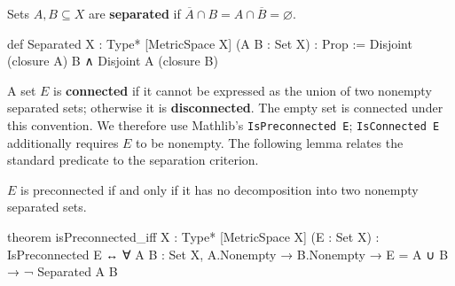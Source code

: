 \begin{definition}
  \label{ma:def:connected-set}
  Sets $A,B\subseteq X$ are \textbf{separated} if $\overline A\cap B=A\cap\overline
    B=\varnothing$.
  \begin{lean}
    def Separated {X : Type*} [MetricSpace X] (A B : Set X) : Prop :=
      Disjoint (closure A) B ∧ Disjoint A (closure B)
  \end{lean}
  A set $E$ is \textbf{connected} if it cannot be expressed as the union of two nonempty separated
  sets; otherwise it is \textbf{disconnected}.
  The empty set is connected under this convention.
  We therefore use Mathlib's \texttt{IsPreconnected E}; \texttt{IsConnected E} additionally
  requires $E$ to be nonempty.
  The following lemma relates the standard predicate to the separation criterion.
\end{definition}

\begin{lemma}
  \label{ma:lem:isPreconnected-iff}
  $E$ is preconnected if and only if it has no decomposition into two nonempty separated sets.

  \begin{lean}
    theorem isPreconnected_iff {X : Type*} [MetricSpace X] (E : Set X) :
        IsPreconnected E ↔
          ∀ A B : Set X, A.Nonempty → B.Nonempty → E = A ∪ B → ¬ Separated A B
  \end{lean}
\end{lemma}


